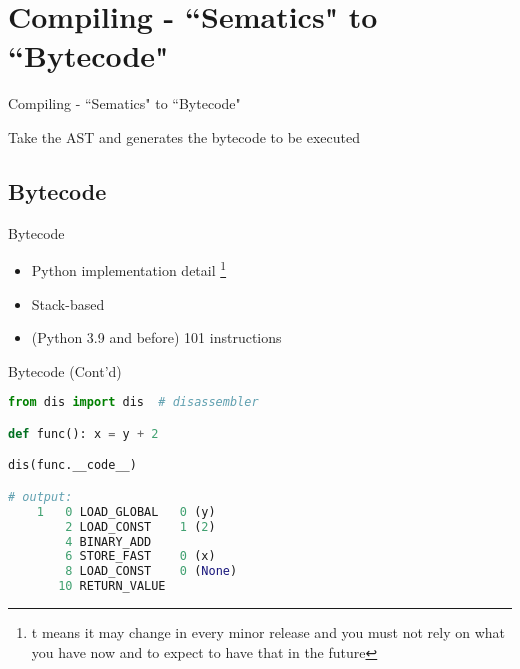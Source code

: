\section{Compiling - ``Sematics" to ``Bytecode"}
\begin{frame}{Compiling - ``Sematics" to ``Bytecode"}
\begin{itemize}
{\LARGE \item[-] Take the AST and generates the bytecode to be executed}
\end{itemize}
\end{frame}

\subsection{Bytecode}
\begin{frame}{Bytecode}
\begin{itemize}
\item[-] Python implementation detail  \footnote{t means it may change in every minor release and you must not rely on what you have now
and to expect to have that in the future}

\item[-] Stack-based
\item[-] (Python 3.9 and before) 101 instructions
\end{itemize}
\end{frame}

\begin{frame}[fragile]{Bytecode (Cont'd)}
\begin{flushleft}
\begin{lstlisting}[language=python, keywordstyle=\color{Mulberry}\textbf]
from dis import dis  # disassembler

def func(): x = y + 2

dis(func.__code__)

# output:
    1   0 LOAD_GLOBAL   0 (y)
        2 LOAD_CONST    1 (2)
        4 BINARY_ADD
        6 STORE_FAST    0 (x)
        8 LOAD_CONST    0 (None)
       10 RETURN_VALUE
\end{lstlisting}
\end{flushleft}
\end{frame}
